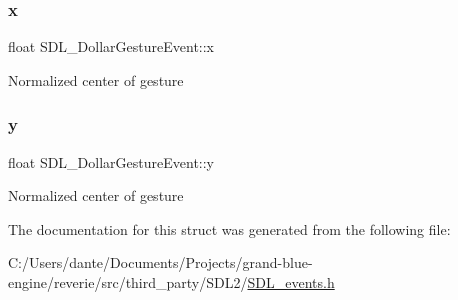 \subsubsection{\texorpdfstring{x}{x}}
{\footnotesize\ttfamily float S\+D\+L\+\_\+\+Dollar\+Gesture\+Event\+::x}

Normalized center of gesture \mbox{\label{struct_s_d_l___dollar_gesture_event_a293b2303acc1cfc63c167c5525e6eab5}} 
\subsubsection{\texorpdfstring{y}{y}}
{\footnotesize\ttfamily float S\+D\+L\+\_\+\+Dollar\+Gesture\+Event\+::y}

Normalized center of gesture 

The documentation for this struct was generated from the following file\+:\begin{DoxyCompactItemize}
\item 
C\+:/\+Users/dante/\+Documents/\+Projects/grand-\/blue-\/engine/reverie/src/third\+\_\+party/\+S\+D\+L2/\mbox{\hyperlink{_s_d_l__events_8h}{S\+D\+L\+\_\+events.\+h}}\end{DoxyCompactItemize}
